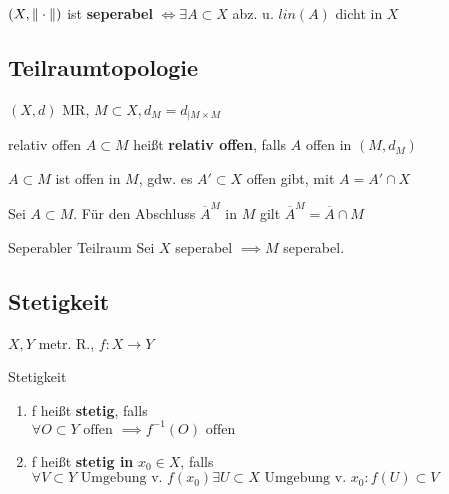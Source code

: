 \begin{lemma}
  $(X, \|\cdot\|)$ ist \textbf{seperabel} $\Leftrightarrow
  \exists A \subset X$ abz. u. $lin(A)$ dicht in \(X\)
\end{lemma}



\subsection{Teilraumtopologie}
\((X,d)\) MR, \(M\subset X, d_M = d_{|M\times M}\)\\

\begin{definition}{relativ offen}
  $A \subset M$ heißt \textbf{relativ offen}, falls $A$ offen in $(M,d_M)$
\end{definition}

\begin{lemma}
  \(A\subset M\) ist offen in \(M\), gdw. es \(A'\subset X\) offen gibt, mit
  \(A = A'\cap X\)
\end{lemma}

\begin{korrolar}
  Sei \(A \subset M\). Für den Abschluss \(\overline{A}^M\) in \(M\) gilt
  \(\overline{A}^M = \overline{A}\cap M\)
\end{korrolar}

\begin{satz}{Seperabler Teilraum}
  Sei \(X\) seperabel \(\implies M\) seperabel.
\end{satz}

\subsection{Stetigkeit}

$X,Y$ metr. R., $f:X\to Y$\\
\begin{definition}{Stetigkeit}
  \begin{enumerate}[label = (\arabic*)]
    \item  f heißt \textbf{stetig}, falls\\
      $\forall O \subset Y \text{ offen } \implies f^{-1}(O) \text{ offen }$
    \item f heißt \textbf{stetig in} $x_0 \in X$, falls\\
      $\forall V \subset Y \text{ Umgebung v. } f(x_0) \exists
      U \subset X \text{ Umgebung v. } x_0: f(U) \subset V$
  \end{enumerate}
\end{definition}

